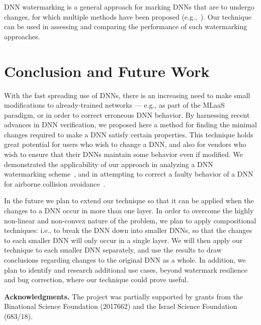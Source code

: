 \documentclass{easychair}
\newcommand{\guy}[1]{\marginpar{\textcolor{orange}{Guy: #1}}}
\begin{document}
DNN watermarking is a general approach for marking DNNs that are to undergo
changes, for which multiple methods have been proposed 
(e.g.,~\cite{AdBaPiKeWatermarking,ChRoKo18,LePeTr19,UcNaSaSa17,VeUsTaOcGa11}).
Our technique can be used in assessing and comparing the
performance of such watermarking approaches.


\section{Conclusion and Future Work}
\label{sec:conclusion}

With the fast spreading use of DNNs, there is an increasing need to
make small modifications to already-trained networks --- e.g., as part
of the MLaaS paradigm, or in order to correct erroneous DNN behavior. By
harnessing recent advances in DNN verification, we proposed here a
method for finding the minimal changes required to make a DNN satisfy
certain properties. This technique holds great potential
for users who wish to change a DNN, and also for vendors who
wish to ensure that their DNNs maintain some behavior even if
modified. We demonstrated the applicability of our approach in
analyzing a DNN watermarking scheme~\cite{AdBaPiKeWatermarking}, and
in attempting to correct a faulty behavior of a DNN for airborne
collision avoidance~\cite{JuLoBrOwKo16}.

In the future we plan to extend our technique so that it can be
applied when the changes to a DNN occur in more than one layer. In
order to overcome the highly non-linear and non-convex nature of the
problem, we plan to apply compositional techniques: i.e., to break the DNN
down into smaller DNNs, so that the changes to each smaller DNN will only occur in
a single layer. We will then apply our technique to each smaller DNN
separately, and use the results to draw conclusions regarding changes
to the original DNN as a whole. In addition, we plan to identify and  research additional
use cases, beyond watermark resilience and bug correction, where our technique
could prove useful.


\noindent
\textbf{Acknowledgments.}
The project was partially supported by grants from the Binational Science
Foundation (2017662) and the Israel Science Foundation (683/18).




\end{document}
